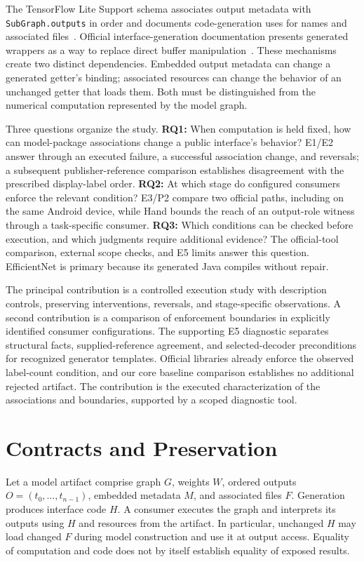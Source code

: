 \documentclass[10pt,twocolumn,letterpaper]{article}
\newcommand{\code}[1]{\texttt{#1}}
\begin{document}
The TensorFlow Lite Support schema associates output metadata with \code{SubGraph.outputs} in order and documents code-generation uses for names and associated files~\cite{schema}. Official interface-generation documentation presents generated wrappers as a way to replace direct buffer manipulation~\cite{codegen-doc}. These mechanisms create two distinct dependencies. Embedded output metadata can change a generated getter's binding; associated resources can change the behavior of an unchanged getter that loads them. Both must be distinguished from the numerical computation represented by the model graph.

Three questions organize the study. \textbf{RQ1:} When computation is held fixed, how can model-package associations change a public interface's behavior? E1/E2 answer through an executed failure, a successful association change, and reversals; a subsequent publisher-reference comparison establishes disagreement with the prescribed display-label order. \textbf{RQ2:} At which stage do configured consumers enforce the relevant condition? E3/P2 compare two official paths, including on the same Android device, while Hand bounds the reach of an output-role witness through a task-specific consumer. \textbf{RQ3:} Which conditions can be checked before execution, and which judgments require additional evidence? The official-tool comparison, external scope checks, and E5 limits answer this question. EfficientNet is primary because its generated Java compiles without repair.

The principal contribution is a controlled execution study with description controls, preserving interventions, reversals, and stage-specific observations. A second contribution is a comparison of enforcement boundaries in explicitly identified consumer configurations. The supporting E5 diagnostic separates structural facts, supplied-reference agreement, and selected-decoder preconditions for recognized generator templates. Official libraries already enforce the observed label-count condition, and our core baseline comparison establishes no additional rejected artifact. The contribution is the executed characterization of the associations and boundaries, supported by a scoped diagnostic tool.

\section{Contracts and Preservation}
\label{sec:contracts}
Let a model artifact comprise graph $G$, weights $W$, ordered outputs $O=(t_0,\ldots,t_{n-1})$, embedded metadata $M$, and associated files $F$. Generation produces interface code $H$. A consumer executes the graph and interprets its outputs using $H$ and resources from the artifact. In particular, unchanged $H$ may load changed $F$ during model construction and use it at output access. Equality of computation and code does not by itself establish equality of exposed results.
\end{document}
